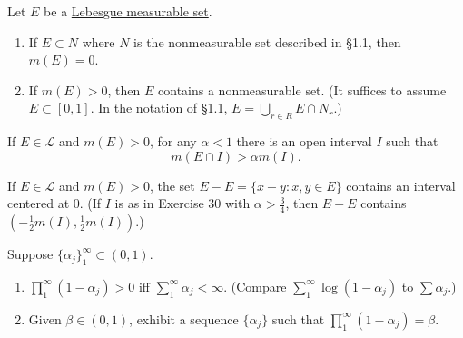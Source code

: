 	\begin{exercise}[Folland 1.29]
		Let $E$ be a \hyperref[def:lebesgue-measurable-set]{Lebesgue measurable set}.
		\begin{enumerate}[label=\textbf{\alph*.}]
			\item If $E \subset N$ where $N$ is the nonmeasurable set described in \S 1.1, then $m(E) = 0$.
			\item If $m(E) > 0$, then $E$ contains a nonmeasurable set. (It suffices to assume $E \subset [0, 1]$. In the notation of \S 1.1, $E = \bigcup_{r \in R} E \cap N_r$.)
		\end{enumerate}
	\end{exercise}
	\begin{solution}

	\end{solution}

	\begin{exercise}[Folland 1.30]
		If $E \in \mathcal{L}$ and $m(E) > 0$, for any $\alpha < 1$ there is an open interval $I$ such that 
		\begin{equation}
			m(E \cap I) > \alpha m(I).
		\end{equation}
	\end{exercise}
	\begin{solution}

	\end{solution}

	\begin{exercise}[Folland 1.31]
		If $E \in \mathcal{L}$ and $m(E) > 0$, the set $E - E = \{x - y : x, y \in E\}$ contains an interval centered at $0$. (If $I$ is as in Exercise 30 with $\alpha > \frac{3}{4}$, then $E - E$ contains $(-\frac{1}{2}m(I), \frac{1}{2}m(I))$.)
	\end{exercise}
	\begin{solution}

	\end{solution}

	\begin{exercise}[Folland 1.32]
		Suppose $\{\alpha_j\}_1^\infty \subset (0, 1)$.
		\begin{enumerate}[label=\textbf{\alph*.}]
			\item $\prod_1^\infty (1 - \alpha_j) > 0$ iff $\sum_1^\infty \alpha_j < \infty$. (Compare $\sum_1^\infty \log(1 - \alpha_j)$ to $\sum \alpha_j$.)
			\item Given $\beta \in (0, 1)$, exhibit a sequence $\{\alpha_j\}$ such that $\prod_1^\infty (1 - \alpha_j) = \beta$.
		\end{enumerate}
	\end{exercise}
	\begin{solution}

	\end{solution}

